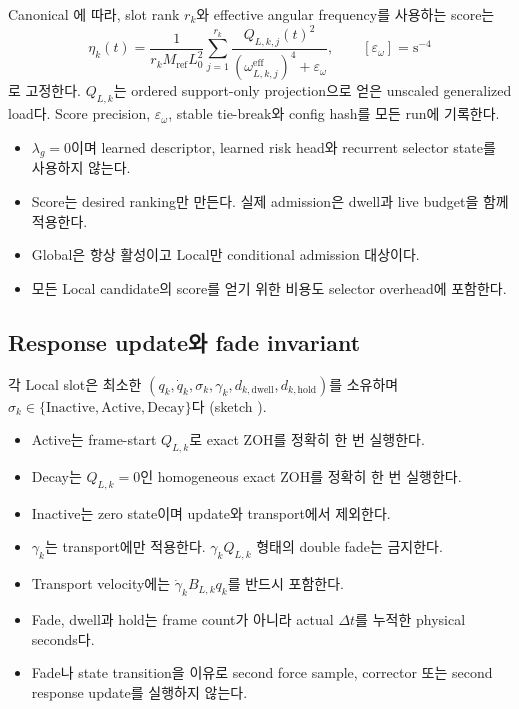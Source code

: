 \documentclass[10pt]{article}
\begin{document}
Canonical 에 따라, slot rank \(r_k\)와 effective angular frequency를 사용하는
score는
\[
  \eta_k(t)=\frac{1}{r_kM_{\mathrm{ref}}L_0^2}
  \sum_{j=1}^{r_k}
  \frac{Q_{L,k,j}(t)^2}
  {(\omega_{L,k,j}^{\mathrm{eff}})^4+\varepsilon_\omega},
  \qquad [\varepsilon_\omega]=\mathrm{s}^{-4}
\]
로 고정한다. \(Q_{L,k}\)는 ordered support-only projection으로 얻은 unscaled generalized load다.
Score precision, \(\varepsilon_\omega\), stable tie-break와 config hash를 모든 run에 기록한다.

\begin{itemize}
  \item \(\lambda_g=0\)이며 learned descriptor, learned risk head와 recurrent selector state를 사용하지 않는다.
  \item Score는 desired ranking만 만든다. 실제 admission은 dwell과 live budget을 함께 적용한다.
  \item Global은 항상 활성이고 Local만 conditional admission 대상이다.
  \item 모든 Local candidate의 score를 얻기 위한 비용도 selector overhead에 포함한다.
\end{itemize}

\subsection{Response update와 fade invariant}

각 Local slot은 최소한 \((q_k,\dot q_k,\sigma_k,\gamma_k,d_{k,\mathrm{dwell}},
d_{k,\mathrm{hold}})\)를 소유하며
\(\sigma_k\in\{\mathrm{Inactive},\mathrm{Active},\mathrm{Decay}\}\)다
(sketch ).

\begin{itemize}
  \item Active는 frame-start \(Q_{L,k}\)로 exact ZOH를 정확히 한 번 실행한다.
  \item Decay는 \(Q_{L,k}=0\)인 homogeneous exact ZOH를 정확히 한 번 실행한다.
  \item Inactive는 zero state이며 update와 transport에서 제외한다.
  \item \(\gamma_k\)는 transport에만 적용한다. \(\gamma_kQ_{L,k}\) 형태의 double fade는 금지한다.
  \item Transport velocity에는 \(\dot\gamma_kB_{L,k}q_k\)를 반드시 포함한다.
  \item Fade, dwell과 hold는 frame count가 아니라 actual \(\Delta t\)를 누적한 physical seconds다.
  \item Fade나 state transition을 이유로 second force sample, corrector 또는 second response update를 실행하지 않는다.
\end{itemize}
\end{document}

